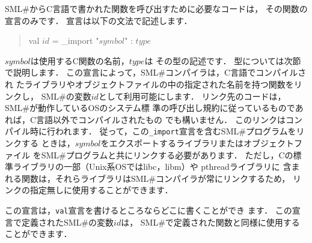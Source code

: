 \documentclass{jbook}
\newif\ifjp
\newcommand{\smlsharp}{SML\#}
\newenvironment{program}{\begin{quote}\begin{tt}}%
                        {\end{tt}\end{quote}}
\begin{document}
\ifjp%
	\smlsharp{}からC言語で書かれた関数を呼び出すために必要なコードは，
その関数の宣言のみです．
	宣言は以下の文法で記述します．
\begin{program}
val $\mathit{id}$ = \_import "$\mathit{symbol}$" : $\mathit{type}$
\end{program}
	$\mathit{symbol}$は使用するC関数の名前，$\mathit{type}$は
その型の記述です．
	型については次節で説明します．
	この宣言によって，\smlsharp{}コンパイラは，C言語でコンパイルされ
たライブラリやオブジェクトファイルの中の指定された名前を持つ関数をリンクし，
\smlsharp{}の変数$\mathit{id}$として利用可能にします．
	リンク先のコードは，\smlsharp{}が動作しているOSのシステム標
準の呼び出し規約に従っているものであれば，C言語以外でコンパイルされたもの
でも構いません．
	このリンクはコンパイル時に行われます．
        従って，この{\tt \_import}宣言を含む\smlsharp{}プログラムをリンクする
ときは，$\mathit{symbol}$をエクスポートするライブラリまたはオブジェクトファイル
を\smlsharp{}プログラムと共にリンクする必要があります．
	ただし，Cの標準ライブラリの一部（Unix系OSではlibc，libm）や
pthreadライブラリに
含まれる関数は，それらライブラリは\smlsharp{}コンパイラが常にリンクするため，
リンクの指定無しに使用することができます．

	この宣言は，{\tt val}宣言を書けるところならどこに書くことができ
ます．
	この宣言で定義された\smlsharp{}の変数$\mathit{id}$は，
\smlsharp{}で定義された関数と同様に使用することができます．
\end{document}
